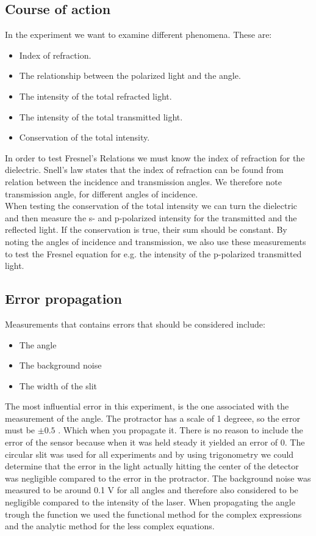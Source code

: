 \documentclass[working]{inputs/tuftebook}
\begin{document}
\subsection*{Course of action}
In the experiment we want to examine different phenomena. These are:
\begin{itemize}
    \item Index of refraction.
    \item The relationship between the polarized light and the angle.
    \item The intensity of the total refracted light.
    \item The intensity of the total transmitted light.
    \item Conservation of the total intensity.
    
\end{itemize}
In order to test Fresnel's Relations we must know the index of refraction for the dielectric. Snell's law states that the index of refraction can be found from relation between the incidence and transmission angles. We therefore note transmission angle, for different angles of incidence. 
\\

When testing the conservation of the total intensity we can turn the dielectric and then measure the s- and p-polarized intensity for the transmitted and the reflected light. If the conservation is true, their sum should be constant. By noting the angles of incidence and transmission, we also use these measurements to test the Fresnel equation for e.g. the intensity of the p-polarized transmitted light. 
\subsection*{Error propagation}
Measurements that contains errors that should be considered include:
\begin{itemize}
    \item The angle 
    \item The background noise
    \item The width of the slit
\end{itemize}
 The most influential error in this experiment, is the one associated with the measurement of the angle. The protractor has a scale of 1 degreee, so the error must be $\pm 0.5$ \textdegree. Which when you propagate it. There is no reason to include the error of the sensor because when it was held steady it yielded an error of 0. The circular slit was used for all experiments and by using trigonometry we could determine that the error in the light actually hitting the center of the detector was negligible compared to the error in the protractor. The background noise was measured to be around 0.1 V for all angles and therefore also considered to be negligible compared to the intensity of the laser. When propagating the angle trough the function we used the functional method for the complex expressions and the analytic method for the less complex equations.
 \\
 
\end{document}
